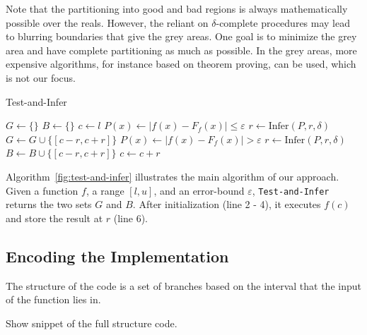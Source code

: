 Note that the partitioning into good and bad regions is always mathematically possible over the reals. However, the reliant on $\delta$-complete procedures may lead to blurring boundaries that give the grey areas. One goal is to minimize the grey area and have complete partitioning as much as possible. In the grey areas, more expensive algorithms, for instance based on theorem proving, can be used, which is not our focus.  

\begin{algorithm}
  \centering
  \caption{Test-and-Infer}
  \label{fig:test-and-infer}
  \begin{algorithmic}[1]
        \State $G \gets \{\}$
        \State $B \gets \{\}$
        \State $c \gets l$
                \State $P(x) \gets |f(x) - F_f(x)| \le \varepsilon$
                \State $r \gets \mathrm{Infer}(P, r, \delta)$
                \State $G \gets G \cup
                                \{ [c - r, c + r] \}$
            \Else
                \State $P(x) \gets |f(x) - F_f(x)| > \varepsilon$
                \State $r \gets \mathrm{Infer}(P, r, \delta)$
                \State $B \gets B \cup
                                \{ [c - r, c + r] \}$
            \EndIf
            \State $c \gets c + r$
        \EndWhile
    \EndProcedure
  \end{algorithmic}
\end{algorithm}
Algorithm~\ref{fig:test-and-infer} illustrates the main algorithm of our
approach. Given a function $f$, a range $[l, u]$, and an error-bound
$\varepsilon$, \texttt{Test-and-Infer} returns the two sets $G$ and
$B$. After initialization (line 2 - 4), it executes $f(c)$ and store
the result at $r$ (line 6).

\subsection{Encoding the Implementation}

The structure of the code is a set of branches based on the interval that the input of the function lies in. 



Show snippet of the full structure code.


